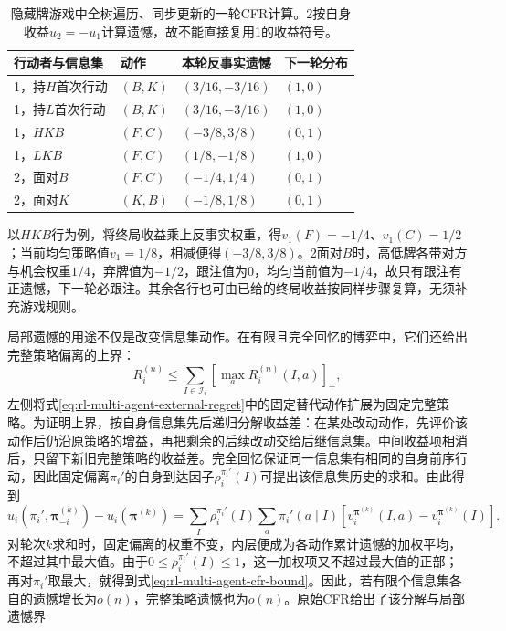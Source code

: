 \begin{table}[htbp]
 \centering
 \begin{tabular}{@{}llll@{}}
 \toprule
 行动者与信息集 & 动作 & 本轮反事实遗憾 & 下一轮分布\\
 \midrule
 1，持$H$首次行动 & $(B,K)$ & $(3/16,-3/16)$ & $(1,0)$\\
 1，持$L$首次行动 & $(B,K)$ & $(3/16,-3/16)$ & $(1,0)$\\
 1，$HKB$ & $(F,C)$ & $(-3/8,3/8)$ & $(0,1)$\\
 1，$LKB$ & $(F,C)$ & $(1/8,-1/8)$ & $(1,0)$\\
 2，面对$B$ & $(F,C)$ & $(-1/4,1/4)$ & $(0,1)$\\
 2，面对$K$ & $(K,B)$ & $(-1/8,1/8)$ & $(0,1)$\\
 \bottomrule
 \end{tabular}
 \caption{隐藏牌游戏中全树遍历、同步更新的一轮CFR计算。2按自身收益$u_2=-u_1$计算遗憾，故不能直接复用1的收益符号。}
 \label{tab:rl-multi-agent-cfr-round}
\end{table}

以$HKB$行为例，将终局收益乘上反事实权重，得$v_1(F)=-1/4$、$v_1(C)=1/2$；当前均匀策略值$v_1=1/8$，相减便得$(-3/8,3/8)$。2面对$B$时，高低牌各带对方与机会权重$1/4$，弃牌值为$-1/2$，跟注值为0，均匀当前值为$-1/4$，故只有跟注有正遗憾，下一轮必跟注。其余各行也可由已给的终局收益按同样步骤复算，无须补充游戏规则。

局部遗憾的用途不仅是改变信息集动作。在有限且完全回忆的博弈中，它们还给出完整策略偏离的上界：
\begin{equation}
 R_i^{(n)}
 \leq\sum_{I\in\mathcal I_i}
        \left[\max_a R_i^{(n)}(I,a)\right]_+,
 \label{eq:rl-multi-agent-cfr-bound}
\end{equation}
左侧将式\eqref{eq:rl-multi-agent-external-regret}中的固定替代动作扩展为固定完整策略。为证明上界，按自身信息集先后递归分解收益差：在某处改动动作，先评价该动作后仍沿原策略的增益，再把剩余的后续改动交给后继信息集。中间收益项相消后，只留下新旧完整策略的收益差。完全回忆保证同一信息集有相同的自身前序行动，因此固定偏离$\pi_i'$的自身到达因子$\rho_i^{\pi_i'}(I)$可提出该信息集历史的求和。由此得到
\[
 u_i(\pi_i',\bm\pi_{-i}^{(k)})-u_i(\bm\pi^{(k)})
 =\sum_I\rho_i^{\pi_i'}(I)
       \sum_a\pi_i'(a\mid I)
       [v_i^{\bm\pi^{(k)}}(I,a)-v_i^{\bm\pi^{(k)}}(I)].
\]
对轮次$k$求和时，固定偏离的权重不变，内层便成为各动作累计遗憾的加权平均，不超过其中最大值。由于$0\leq\rho_i^{\pi_i'}(I)\leq1$，这一加权项又不超过最大值的正部；再对$\pi_i'$取最大，就得到式\eqref{eq:rl-multi-agent-cfr-bound}。因此，若有限个信息集各自的遗憾增长为$o(n)$，完整策略遗憾也为$o(n)$。原始CFR给出了该分解与局部遗憾界

